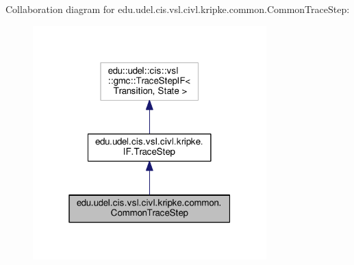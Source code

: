 Collaboration diagram for edu.\+udel.\+cis.\+vsl.\+civl.\+kripke.\+common.\+Common\+Trace\+Step\+:
\nopagebreak
\begin{figure}[H]
\begin{center}
\leavevmode
\includegraphics[width=256pt]{classedu_1_1udel_1_1cis_1_1vsl_1_1civl_1_1kripke_1_1common_1_1CommonTraceStep__coll__graph}
\end{center}
\end{figure}
